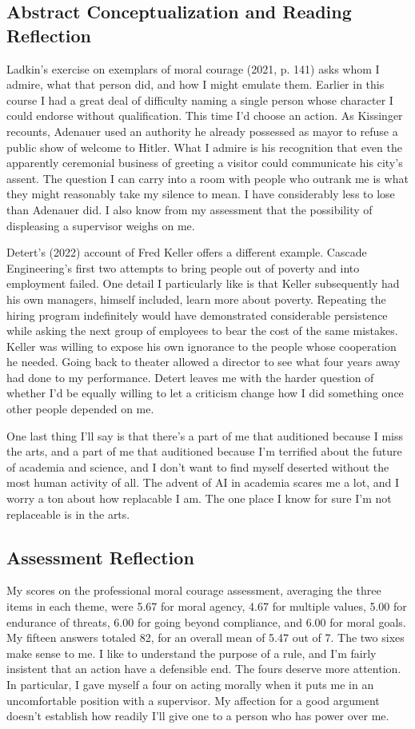 \documentclass[12pt,letterpaper]{article}
\begin{document}
\subsection{Abstract Conceptualization and Reading Reflection}
Ladkin's exercise on exemplars of moral courage (2021, p. 141) asks whom I admire, what that person did, and how I might emulate them. Earlier in this course I had a great deal of difficulty naming a single person whose character I could endorse without qualification. This time I'd choose an action. As Kissinger recounts, Adenauer used an authority he already possessed as mayor to refuse a public show of welcome to Hitler. What I admire is his recognition that even the apparently ceremonial business of greeting a visitor could communicate his city's assent. The question I can carry into a room with people who outrank me is what they might reasonably take my silence to mean. I have considerably less to lose than Adenauer did. I also know from my assessment that the possibility of displeasing a supervisor weighs on me.

Detert's (2022) account of Fred Keller offers a different example. Cascade Engineering's first two attempts to bring people out of poverty and into employment failed. One detail I particularly like is that Keller subsequently had his own managers, himself included, learn more about poverty. Repeating the hiring program indefinitely would have demonstrated considerable persistence while asking the next group of employees to bear the cost of the same mistakes. Keller was willing to expose his own ignorance to the people whose cooperation he needed. Going back to theater allowed a director to see what four years away had done to my performance. Detert leaves me with the harder question of whether I'd be equally willing to let a criticism change how I did something once other people depended on me.

One last thing I'll say is that there's a part of me that auditioned because I miss the arts, and a part of me that auditioned because I'm terrified about the future of academia and science, and I don't want to find myself deserted without the most human activity of all.
The advent of AI in academia scares me a lot, and I worry a ton about how replacable I am.
The one place I know for sure I'm not replaceable is in the arts.

\subsection{Assessment Reflection}
My scores on the professional moral courage assessment, averaging the three items in each theme, were 5.67 for moral agency, 4.67 for multiple values, 5.00 for endurance of threats, 6.00 for going beyond compliance, and 6.00 for moral goals. My fifteen answers totaled 82, for an overall mean of 5.47 out of 7. The two sixes make sense to me. I like to understand the purpose of a rule, and I'm fairly insistent that an action have a defensible end. The fours deserve more attention. In particular, I gave myself a four on acting morally when it puts me in an uncomfortable position with a supervisor. My affection for a good argument doesn't establish how readily I'll give one to a person who has power over me.
\end{document}
